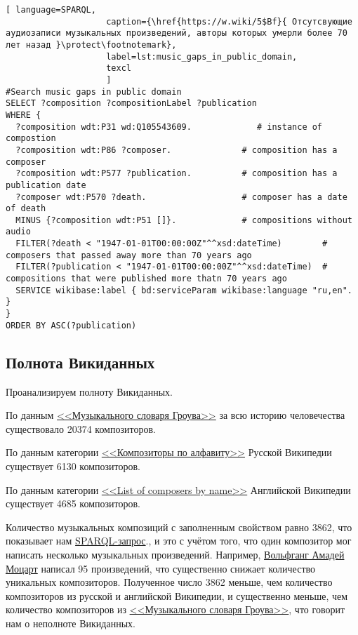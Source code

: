 \begin{lstlisting}[ language=SPARQL,
                    caption={\href{https://w.wiki/5$Bf}{ Отсутсвующие аудиозаписи музыкальных произведений, авторы которых умерли более 70 лет назад }\protect\footnotemark},
                    label=lst:music_gaps_in_public_domain,
                    texcl 
                    ]
#Search music gaps in public domain
SELECT ?composition ?compositionLabel ?publication
WHERE {
  ?composition wdt:P31 wd:Q105543609.             # instance of compostion
  ?composition wdt:P86 ?composer.              # composition has a composer
  ?composition wdt:P577 ?publication.          # composition has a publication date
  ?composer wdt:P570 ?death.                   # composer has a date of death
  MINUS {?composition wdt:P51 []}.             # compositions without audio 
  FILTER(?death < "1947-01-01T00:00:00Z"^^xsd:dateTime)        # composers that passed away more than 70 years ago
  FILTER(?publication < "1947-01-01T00:00:00Z"^^xsd:dateTime)  # compositions that were published more thatn 70 years ago
  SERVICE wikibase:label { bd:serviceParam wikibase:language "ru,en". }
}
ORDER BY ASC(?publication)
\end{lstlisting}%


\subsection{Полнота Викиданных}
Проанализируем полноту Викиданных.

По данным \href{https://ru.wikipedia.org/wiki/Музыкальный_словарь_Гроува}{<<Музыкального словаря Гроува>>} за всю историю человечества существовало \num{20374} композиторов.

По данным категории \href{https://ru.wikipedia.org/wiki/Категория:Композиторы_по_алфавиту}{<<Композиторы по алфавиту>>} Русской Википедии существует \num{6130} композиторов.

По данным категории \href{https://en.wikipedia.org/wiki/List_of_composers_by_name}{<<List of composers by name>>} Английской Википедии существует \num{4685} композиторов.

Количество музыкальных композиций с заполненным свойством  равно \num{3862}, {что показывает нам \href{https://w.wiki/56Rc}{SPARQL-запрос}.}, и это с учётом того, что один композитор мог написать несколько музыкальных произведений. Например, \href{https://ru.wikipedia.org/wiki/Моцарт,_Вольфганг_Амадей}{Вольфганг Амадей Моцарт} написал \num{95} произведений, что существенно снижает количество уникальных композиторов. Полученное число \num{3862} меньше, чем количество композиторов из русской и английской Википедии, и существенно меньше, чем количество композиторов из \href{https://ru.wikipedia.org/wiki/Музыкальный_словарь_Гроува}{<<Музыкального словаря Гроува>>}, что говорит нам о неполноте Викиданных.

